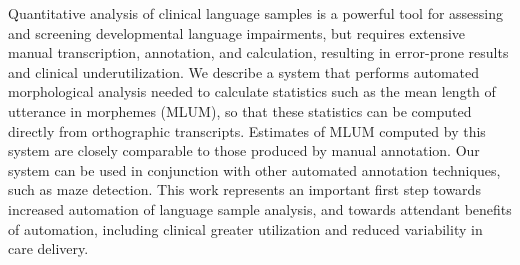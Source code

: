 Quantitative analysis of clinical language samples is a powerful tool for assessing and screening developmental language impairments, but requires extensive manual transcription, annotation, and calculation, resulting in error-prone results and clinical underutilization. We describe a system that performs automated morphological analysis needed to calculate statistics such as the mean length of utterance in morphemes (MLUM), so that these statistics can be computed directly from orthographic transcripts. Estimates of MLUM computed by this system are closely comparable to those produced by manual annotation. Our system can be used in conjunction with other automated annotation techniques, such as maze detection. This work represents an important first step towards increased automation of language sample analysis, and towards attendant benefits of automation, including clinical greater utilization and reduced variability in care delivery.
